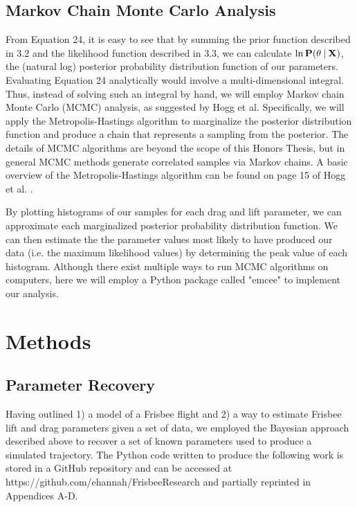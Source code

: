 \documentclass[a4paper,12pt, oneside]{article}
\newcommand\givenbase[1][]{\:#1\lvert\:}
\let\given\givenbase
\begin{document}
\subsection{Markov Chain Monte Carlo Analysis}
From Equation 24, it is easy to see that by summing the prior function described in 3.2 and the likelihood function described in 3.3, we can calculate $\ln\bold{P}(\theta\given\bold{X})$, the (natural log) posterior probability distribution function of our parameters. Evaluating Equation 24 analytically would involve a multi-dimensional integral. Thus, instead of solving such an integral by hand, we will employ Markov chain Monte Carlo (MCMC) analysis, as suggested by Hogg et al. Specifically, we will apply the Metropolis-Hastings algorithm to marginalize the posterior distribution function and produce a chain that represents a sampling from the posterior. The details of MCMC algorithms are beyond the scope of this Honors Thesis, but in general MCMC methods generate correlated samples via Markov chains. A basic overview of the Metropolis-Hastings algorithm can be found on page 15 of Hogg et al. \cite{hogg2010data}. 

By plotting histograms of our samples for each drag and lift parameter, we can approximate each marginalized posterior probability distribution function. We can then estimate the the parameter values most likely to have produced our data (i.e. the maximum likelihood values) by determining the peak value of each histogram. Although there exist multiple ways to run MCMC algorithms on computers, here we will employ a Python package called "emcee" to implement our analysis.
\section{Methods}
\subsection{Parameter Recovery}
Having outlined 1) a model of a Frisbee flight and 2) a way to estimate Frisbee lift and drag parameters given a set of data, we employed the Bayesian approach described above to recover a set of known parameters used to produce a simulated trajectory. The Python code written to produce the following work is stored in a GitHub repository and can be accessed at https://github.com/ehannah/FrisbeeResearch and partially reprinted in Appendices A-D. 
\end{document}
